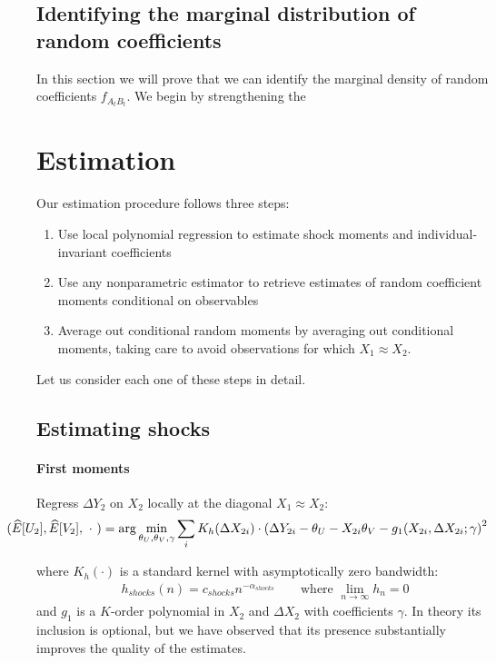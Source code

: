 \subsection{Identifying the marginal distribution of random coefficients}

In this section we will prove that we can identify the marginal density of random coefficients $f_{A_tB_t}$. We begin by strengthening the 




\section{Estimation} \label{sec:estimation}

Our estimation procedure follows three steps:

\begin{enumerate}
  \item Use local polynomial regression to estimate shock moments and individual-invariant coefficients
  \item Use any nonparametric estimator to retrieve estimates of random coefficient moments conditional on observables
  \item Average out conditional random moments by averaging out conditional moments, taking care to avoid
  observations for which $X_1 \approx X_2$.
\end{enumerate}

Let us consider each one of these steps in detail.

\subsection*{Estimating shocks}

\paragraph{First moments} Regress $\Delta Y_2$ on $X_2$ locally at the diagonal $X_1 \approx X_2$:
\begin{align}
  \hspace*{-1cm}
  (\widehat{E}[U_2], \widehat{E}[V_2], \ \cdot \ ) = \arg \min_{\theta_{U} ,\theta_{V}, \gamma}
\sum_{i} K_h (\Delta X_{2i}) \cdot 
      \left( \Delta Y_{2i} - \theta_{U} - X_{2i}\theta_{V} - g_1(X_{2i}, \Delta X_{2i}; \gamma \right)^2
\end{align}

\noindent where $K_h(\cdot)$ is a standard kernel with asymptotically zero bandwidth:
\begin{align}
  h_{shocks}(n) = c_{shocks}n^{−\alpha_{shocks}} \qquad \text{where } \lim_{n\rightarrow \infty} h_{n} = 0
\end{align}
\noindent and $g_1$ is a $K$-order polynomial in $X_2$ and $\Delta X_2$ with coefficients $\gamma$. In theory its inclusion is optional, but we have observed that its presence substantially improves the quality of the estimates. 

